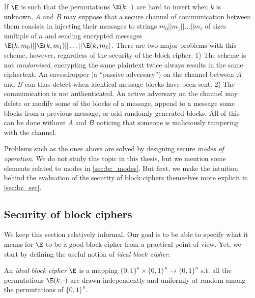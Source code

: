 If $\E$ is such that the permutations $\E(k,\cdot)$ are hard to invert when $k$ is unknown, $A$ and $B$ may suppose that a secure channel of communication
between them consists in injecting their messages to strings $m_0||m_1||\ldots||m_\ell$ of sizes multiple of $n$ and sending encrypted messages
$\E(k,m_0)||\E(k,m_1)||\ldots||\E(k,m_\ell)$. There are two major problems with this scheme, however, regardless of the security of the block
cipher: 1) The scheme is not \emph{randomised}, \ie encrypting the same plaintext twice always results in the same ciphertext. An eavesdropper
(a ``passive adversary'') on the channel between $A$ and $B$ can thus detect when identical message blocks have been sent. 2) The
communication is not authenticated. An active adversary on the channel may delete or modify some of the blocks of a message, append to a message
some blocks from a previous message, or add randomly generated blocks. All of this can be done without $A$ and $B$ noticing that someone
is maliciously tampering with the channel.

Problems such as the ones above are solved by designing secure \emph{modes of operation}. We do not study this topic in this thesis, but
we mention some elements related to modes in \autoref{sec:bc_modes}. But first, we make the intuition behind the evaluation of the security
of block ciphers themselves more explicit in \autoref{sec:bc_sec}.

\subsection{Security of block ciphers}

We keep this section relatively informal. Our goal is to be able to specify what it means for $\E$ to be a good block cipher from
a practical point of view. Yet, we start by defining the useful notion of \emph{ideal block cipher}.

\begin{defi}
An \emph{ideal block cipher} $\E$ is a mapping $\{0,1\}^\kappa \times \{0,1\}^n \rightarrow \{0,1\}^n$ s.t. all the permutations
$\E(k,\cdot)$ are drawn independently and uniformly at random among the permutations of $\{0,1\}^n$.
\end{defi}

